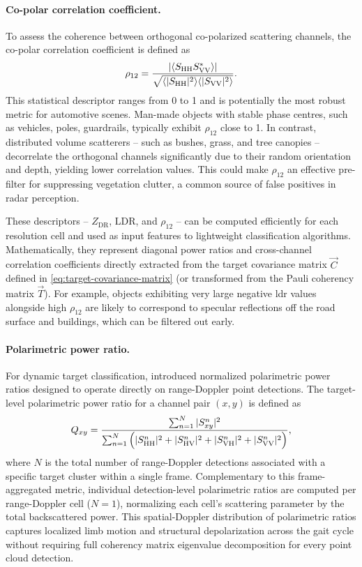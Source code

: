 \paragraph{Co-polar correlation coefficient.}
To assess the coherence between orthogonal co-polarized scattering channels, the co-polar correlation coefficient is defined as
\begin{align}
    \label{eq:copolar-correlation-coefficient}
    \rho_{12} = \frac{|\langle S_{\mathrm{HH}} S_{\mathrm{VV}}^* \rangle|}{\sqrt{\langle |S_{\mathrm{HH}}|^2 \rangle \langle |S_{\mathrm{VV}}|^2 \rangle}}.
\end{align}
This statistical descriptor ranges from 0 to 1 and is potentially the most robust metric for automotive scenes.
Man-made objects with stable phase centres, such as vehicles, poles, guardrails, typically exhibit $\rho_{12}$ close to 1.
In contrast, distributed volume scatterers -- such as bushes, grass, and tree canopies -- decorrelate the orthogonal channels significantly due to their random orientation and depth, yielding lower correlation values.
This could make $\rho_{12}$ an effective pre-filter for suppressing vegetation clutter, a common source of false positives in radar perception.

These descriptors -- $Z_\mathrm{DR}$, $\mathrm{LDR}$, and $\rho_{12}$ -- can be computed efficiently for each resolution cell and used as input features to lightweight classification algorithms.
Mathematically, they represent diagonal power ratios and cross-channel correlation coefficients directly extracted from the target covariance matrix $\vec C$ defined in \cref{eq:target-covariance-matrix} (or transformed from the Pauli coherency matrix $\vec T$).
For example, objects exhibiting very large negative \gls{ldr} values alongside high $\rho_{12}$ are likely to correspond to specular reflections off the road surface and buildings, which can be filtered out early.

\paragraph{Polarimetric power ratio.}
For dynamic target classification, \textcite{bouwmeesterClassificationDynamicVulnerable2025} introduced normalized polarimetric power ratios designed to operate directly on range-Doppler point detections.
The target-level polarimetric power ratio for a channel pair $(x,y)$ is defined as
\begin{align}
    \label{eq:polarimetric-power-ratio}
    Q_{xy} = \frac{\sum_{n=1}^N |S_{xy}^n|^2}{\sum_{n=1}^N \Big( |S_{\mathrm{HH}}^n|^2 + |S_{\mathrm{HV}}^n|^2 + |S_{\mathrm{VH}}^n|^2 + |S_{\mathrm{VV}}^n|^2 \Big)},
\end{align}
where $N$ is the total number of range-Doppler detections associated with a specific target cluster within a single frame.
Complementary to this frame-aggregated metric, individual detection-level polarimetric ratios are computed per range-Doppler cell ($N=1$), normalizing each cell's scattering parameter by the total backscattered power.
This spatial-Doppler distribution of polarimetric ratios captures localized limb motion and structural depolarization across the gait cycle without requiring full coherency matrix eigenvalue decomposition for every point cloud detection.


